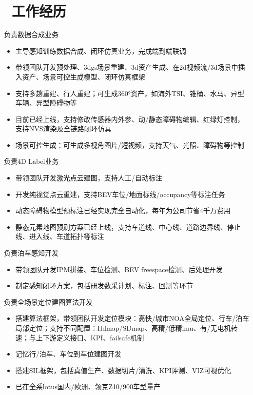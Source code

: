 \documentclass{resume}
\begin{document}
\section{\faUsers\ 工作经历}
\begin{onehalfspacing}

  负责数据合成业务
  \begin{itemize}
    \item 主导感知训练数据合成、闭环仿真业务，完成端到端联调
    \item 带领团队开发预处理、3dgs场景重建、3d资产生成、在2d视频流/3d场景中插入资产、场景可控生成模型、闭环仿真框架
    \item 支持多趟重建、行人重建；可生成360°资产，如海外TSI、锥桶、水马、异型车辆、异型障碍物等
    \item 目前已经上线，支持修改传感器内外参、动/静态障碍物编辑、红绿灯控制，支持NVS渲染及全链路闭环仿真
    \item 场景可控生成：可生成多视角图片/短视频，支持天气、光照、障碍物等控制
  \end{itemize}

  负责4D Label业务
  \begin{itemize}
    \item 带领团队开发激光点云建图，支持人工/自动标注
    \item 开发纯视觉点云重建，支持BEV车位/地面标线/occupancy等标注任务
    \item 动态障碍物模型预标注已经实现完全自动化，每年为公司节省4千万费用
    \item 静态元素地图预刷方案已经上线，支持车道线、中心线、道路边界线、停止线、进入线、车道拓扑等标注
  \end{itemize}

  负责泊车感知开发
  \begin{itemize}
    \item 带领团队开发IPM拼接、车位检测、BEV freespace检测、后处理开发
    \item 制定感知闭环方案，包括研发数采计划、标注、回测等环节
  \end{itemize}

  负责全场景定位建图算法开发
  \begin{itemize}
    \item {搭建算法框架，带领团队开发定位模块：高快/城市NOA全局定位、行车/泊车局部定位；支持不同配置：Hdmap/SDmap、高精/低精imu、有/无电机转速；与上下游定义接口、KPI、failsafe机制}
    \item 记忆行/泊车、车位到车位建图开发
    \item 搭建SIL框架，包括真值生产、数据切片/清洗、KPI评测、VIZ可视优化
    \item 已在全系lotus国内/欧洲、领克Z10/900车型量产
  \end{itemize}
\end{onehalfspacing}
\end{document}
